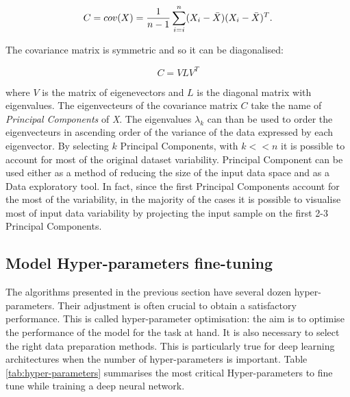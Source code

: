 \begin{equation} \label{eq:covariance}
    C = cov(X) = \frac{1}{n - 1} \sum_{i=i}^{n} (X_{i} - \Bar{X})(X_{i} - \Bar{X})^{T}.
\end{equation}

The covariance matrix is symmetric and so it can be diagonalised:

\begin{equation}
    C = VLV^T
\end{equation}

where $V$ is the matrix of eigenevectors and $L$ is the diagonal matrix with eigenvalues. The eigenvecteurs of the covariance matrix $C$ take the name of \textit{Principal Components} of \textit{X}. The eigenvalues $\lambda_{k}$ can than be used to order the eigenvecteurs in ascending order of the variance of the data expressed by each eigenvector. By selecting $k$ Principal Components, with $k << n$ it is possible to account for most of the original dataset variability. Principal Component can be used either as a method of reducing the size of the input data space and as a Data exploratory tool. In fact, since the first Principal Components account for the most of the variability, in the majority of the cases it is possible to visualise most of input data variability by projecting the input sample on the first 2-3 Principal Components. 



\subsection{Model Hyper-parameters fine-tuning}

The algorithms presented in the previous section have several dozen hyper-parameters. Their adjustment is often crucial to obtain a satisfactory performance. This is called hyper-parameter optimisation: the aim is to optimise the performance of the model for the task at hand. It is also necessary to select the right data preparation methods. This is particularly true for deep learning architectures when the number of hyper-parameters is important. Table \ref{tab:hyper-parameters} summarises the most critical Hyper-parameters to fine tune while training a deep neural network.

